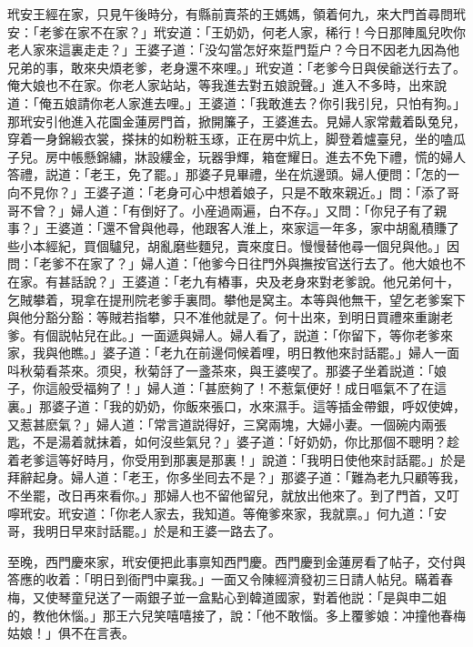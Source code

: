 玳安王經在家，只見午後時分，有縣前賣茶的王媽媽，領着何九，來大門首尋問玳安：「老爹在家不在家？」玳安道：「王奶奶，何老人家，稀行！今日那陣風兒吹你老人家來這裏走走？」王婆子道：「没勾當怎好來踅門踅户？今日不因老九因為他兄弟的事，敢來央煩老爹，老身還不來哩。」玳安道：「老爹今日與侯爺送行去了。俺大娘也不在家。你老人家站站，等我進去對五娘說聲。」進入不多時，出來說道：「俺五娘請你老人家進去哩。」王婆道：「我敢進去？你引我引兒，只怕有狗。」那玳安引他進入花園金蓮房門首，掀開簾子，王婆進去。見婦人家常戴着臥兔兒，穿着一身錦緞衣裳，搽抹的如粉粧玉琢，正在房中炕上，脚登着爐臺兒，坐的嗑瓜子兒。房中帳懸錦繡，牀設縷金，玩器爭輝，箱奩耀日。進去不免下禮，慌的婦人答禮，説道：「老王，免了罷。」那婆子見畢禮，坐在炕邊頭。婦人便問：「怎的一向不見你？」王婆子道：「老身可心中想着娘子，只是不敢來親近。」問：「添了哥哥不曾？」婦人道：「有倒好了。小産過兩遍，白不存。」又問：「你兒子有了親事？」王婆道：「還不曾與他尋，他跟客人淮上，來家這一年多，家中胡亂積賺了些小本經紀，買個驢兒，胡亂磨些麵兒，賣來度日。慢慢替他尋一個兒與他。」因問：「老爹不在家了？」婦人道：「他爹今日往門外與撫按官送行去了。他大娘也不在家。有甚話說？」王婆道：「老九有樁事，央及老身來對老爹說。他兄弟何十，乞賊攀着，現拿在提刑院老爹手裏問。攀他是窝主。本等與他無干，望乞老爹案下與他分豁分豁：等賊若指攀，只不准他就是了。何十出來，到明日買禮來重謝老爹。有個説帖兒在此。」一面遞與婦人。婦人看了，説道：「你留下，等你老爹來家，我與他瞧。」婆子道：「老九在前邊伺候着哩，明日教他來討話罷。」婦人一面呌秋菊看茶來。须臾，秋菊㧱了一盞茶來，與王婆喫了。那婆子坐着説道：「娘子，你這般受福夠了！」婦人道：「甚麽夠了！不惹氣便好！成日嘔氣不了在這裏。」那婆子道：「我的奶奶，你飯來張口，水來濕手。這等插金帶銀，呼奴使婢，又惹甚麽氣？」婦人道：「常言道説得好，三窝兩塊，大婦小妻。一個碗内兩張匙，不是湯着就抹着，如何沒些氣兒？」婆子道：「好奶奶，你比那個不聰明？趁着老爹這等好時月，你受用到那裏是那裏！」說道：「我明日使他來討話罷。」於是拜辭起身。婦人道：「老王，你多坐囘去不是？」那婆子道：「難為老九只顧等我，不坐罷，改日再來看你。」那婦人也不留他留兒，就放出他來了。到了門首，又叮嚀玳安。玳安道：「你老人家去，我知道。等俺爹來家，我就禀。」何九道：「安哥，我明日早來討話罷。」於是和王婆一路去了。

至晚，西門慶來家，玳安便把此事禀知西門慶。西門慶到金蓮房看了帖子，交付與答應的收着：「明日到衙門中稟我。」一面又令陳經濟發初三日請人帖兒。瞞着春梅，又使琴童兒送了一兩銀子並一盒點心到韓道國家，對着他説：「是與申二姐的，教他休惱。」那王六兒笑嘻嘻接了，說：「他不敢惱。多上覆爹娘：冲撞他春梅姑娘！」俱不在言表。

